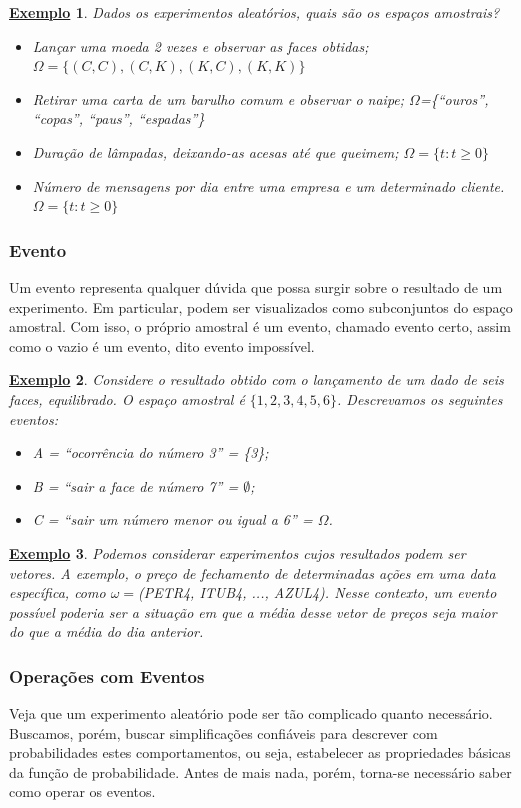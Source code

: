 \documentclass{article}
\newtheorem{example}{\underline{Exemplo}}
\begin{document}
\begin{example}
  Dados os experimentos aleatórios, quais são os espaços amostrais?
  \begin{itemize}
    \item[\(E_{1}\))] Lançar uma moeda 2 vezes e observar as faces obtidas; \(\Omega =\{(C, C), (C, K), (K, C), (K, K)\}\)
    \item[\(E_{2}\))] Retirar uma carta de um barulho comum e observar o naipe; \(\Omega\)=\{``ouros'', ``copas'', ``paus'', ``espadas''\}
    \item[\(E_{3}\))] Duração de lâmpadas, deixando-as acesas até que queimem; \(\Omega = \{t: t\geq 0\}\)
    \item[\(E_{4}\))] Número de mensagens por dia entre uma empresa e um determinado cliente. \(\Omega = \{t: t\geq 0\}\)
  \end{itemize}
\end{example}
\subsubsection{Evento}
Um evento representa qualquer dúvida que possa surgir sobre o resultado de um experimento. Em particular, podem ser visualizados como subconjuntos do espaço amostral. Com isso,
o próprio amostral é um evento, chamado evento certo, assim como o vazio é um evento, dito evento impossível.
\begin{example}
  Considere o resultado obtido com o lançamento de um dado de seis faces, equilibrado. O espaço amostral é \(\{1, 2, 3, 4, 5, 6\}\). Descrevamos os seguintes eventos:
  \begin{itemize}
    \item[1)] A = ``ocorrência do número 3'' = \{3\};
    \item[2)] B = ``sair a face de número 7'' = \(\emptyset\);
    \item[3)] C = ``sair um número menor ou igual a 6'' = \(\Omega \).
  \end{itemize}
\end{example}
\begin{example}
  Podemos considerar experimentos cujos resultados podem ser vetores. A exemplo, o preço de fechamento de determinadas
  ações em uma data específica, como \(\omega = \)(PETR4, ITUB4, ..., AZUL4). Nesse contexto, um evento possível poderia ser 
  a situação em que a média desse vetor de preços seja maior do que a média do dia anterior.
\end{example}
\subsubsection{Operações com Eventos}
Veja que um experimento aleatório pode ser tão complicado quanto necessário. Buscamos, porém, buscar simplificações confiáveis para descrever com probabilidades
estes comportamentos, ou seja, estabelecer as propriedades básicas da função de probabilidade. Antes de mais nada, porém, torna-se necessário
saber como operar os eventos. 
\end{document}
